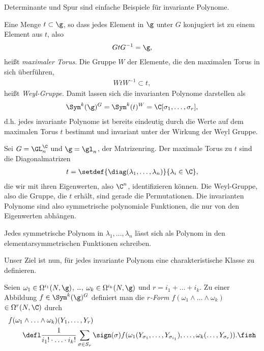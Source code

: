 \documentclass[%
	paper=a5,%
	fleqn,%
	DIV=18,%
	BCOR=0mm,
	fontsize=11pt,
	titlepage=false,%
	bibliography=totoc,
	DIV=18,%
	twoside=true,
	pdftitle=Riemannsche Geometrie,
	pdfauthor=Uwe Semmelmann,
	numbers=noendperiod]%
	{scrbook}
\begin{document}
Determinante und Spur sind einfache Beispiele für invariante Polynome.

\begin{rem}
Eine Menge $t\subset\g$, so dass jedes Element in $\g$ unter $G$ konjugiert ist zu einem Element aus $t$, also
\begin{align*}
GtG^{-1} = \g,
\end{align*}
heißt \emph{maximaler Torus}. Die Gruppe $W$ der Elemente, die den maximalen Torus in sich überführen,
\begin{align*}
WtW^{-1} \subset t,
\end{align*}
heißt \emph{Weyl-Gruppe}. Damit lassen sich die invarianten Polynome darstellen als
\begin{align*}
\Sym^k(\g)^G = \Sym^k(t)^W = \C[\sigma_{1},\ldots,\sigma_{r}],
\end{align*}
d.h. jedes invariante Polynome ist bereits eindeutig durch die Werte auf dem maximalen Torus $t$ bestimmt und invariant unter der Wirkung der Weyl Gruppe.\map
\end{rem}

\begin{ex}
Sei $G=\GL_n^\C$ und $\g = \gl_n$, der Matrizenring.  Der maximale Torus zu $t$ sind die Diagonalmatrizen
\begin{align*}
t = \setdef{\diag(\lambda_{1},\ldots,\lambda_{n})}{\lambda_{i}\in \C},
\end{align*}
die wir mit ihren Eigenwerten, also $\C^n$, identifizieren können. Die Weyl-Gruppe, also die Gruppe, die $t$ erhält, sind gerade die Permutationen. Die invarianten Polynome sind also symmetrische polynomiale Funktionen, die nur von den
Eigenwerten abhängen.~\bsp
\end{ex}

\begin{prop}
Jedes symmetrische Polynom in $\lambda_1,\ldots,\lambda_n$ lässt sich als
Polynom in den elementarsymmetrischen Funktionen schreiben.\fish
\end{prop}

Unser Ziel ist nun, für jedes invariante Polynom eine charakteristische Klasse
zu definieren.

\begin{defn}
Seien $\omega_1 \in \Omega^{i_1}(N,\g)$, \ldots, $\omega_k\in\Omega^{i_k}(N,\g)$
und $r=i_1+\ldots+i_k$. Zu einer Abbildung $f\in \Sym^k(\g)^G$ definiert man 
die \emph{$r$-Form $f(\omega_1\wedge \ldots \wedge
\omega_k)$} $\in\Omega^r(N,\C)$ durch
\begin{align*}
&f(\omega_1\wedge \ldots \wedge \omega_k)(Y_1,\ldots,Y_r) \\
&\qquad\defl
\frac{1}{i_1!\cdot \ldots \cdot i_k!} \sum_{\sigma\in S_r}
\sign(\sigma) f(\omega_1(Y_{\sigma_1},\ldots,Y_{\sigma_{i_1}}), \ldots,
\omega_k(\ldots,Y_{\sigma_r})).\fish
\end{align*}
\end{defn}
\end{document}
